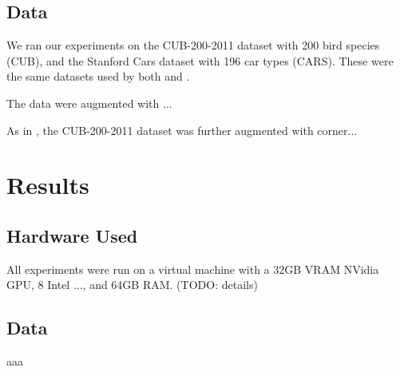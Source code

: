 \documentclass{rescience}
\begin{document}
\subsection{Data}
We ran our experiments on the CUB-200-2011 dataset with 200
bird species (CUB), and the Stanford Cars dataset with 196 car
types (CARS).\cite{krause20133d}\cite{wah2011caltech} These were the same datasets used by both \cite{chen2019looks} and \cite{nauta2021neural}.

The data were augmented with ...

As in \cite{nauta2021neural}, the CUB-200-2011 dataset was further augmented with corner...

\section{Results}
\subsection{Hardware Used}
All experiments were run on a virtual machine with a 32GB VRAM NVidia GPU, 8 Intel ..., and 64GB RAM. (TODO: details)

\subsection{Data}
aaa

\setlength\bibitemsep{0pt}
\printbibliography
\end{document}
